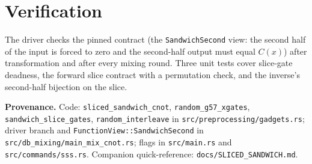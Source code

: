 \documentclass[11pt]{article}
\newcommand{\code}[1]{\texttt{#1}}
\begin{document}
\section{Verification}

The driver checks the pinned contract (the \code{SandwichSecond} view: the
second half of the input is forced to zero and the second-half output must
equal $C(x)$) after transformation and after every mixing round. Three unit
tests cover slice-gate deadness, the forward slice contract with a
permutation check, and the inverse's second-half bijection on the slice.

\vspace{6pt}
\noindent\textbf{Provenance.} Code: \code{sliced\_sandwich\_cnot},
\code{random\_g57\_xgates}, \code{sandwich\_slice\_gates},
\code{random\_interleave} in \code{src/preprocessing/gadgets.rs}; driver branch and
\code{FunctionView::SandwichSecond} in \code{src/db\_mixing/main\_mix\_cnot.rs};
flags in \code{src/main.rs} and \code{src/commands/sss.rs}. Companion
quick-reference: \code{docs/SLICED\_SANDWICH.md}.
\end{document}
